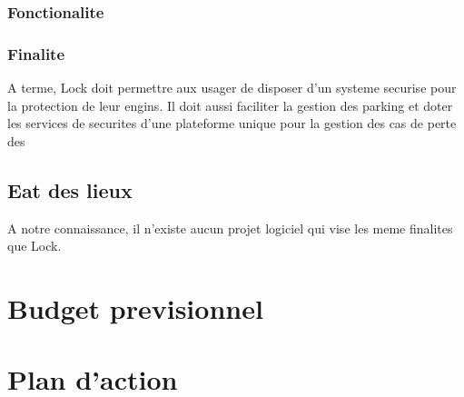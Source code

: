 \documentclass{book}
\begin{document}
\subsection{Fonctionalite}

\subsection{Finalite}
A terme, Lock doit permettre aux usager de disposer d'un systeme securise pour la protection de leur engins. Il doit aussi faciliter 
la gestion des parking et doter les services de securites d'une plateforme unique pour la gestion des cas de perte des 

\section{Eat des lieux}
A notre connaissance, il n'existe aucun projet logiciel qui vise les meme finalites que Lock. 

\chapter{ Budget previsionnel }

\chapter{ Plan d'action }
\end{document}
